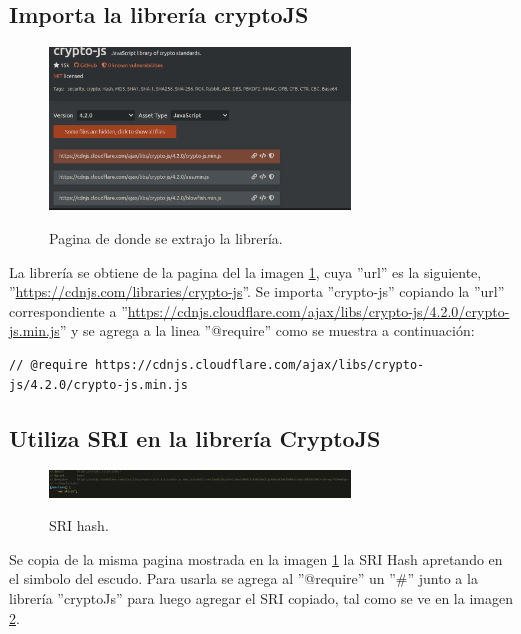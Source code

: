 \documentclass[letter,12pt]{article}
\begin{document}
\subsection{Importa la librería cryptoJS}
    \begin{figure}[H]
        \centering
        \includegraphics[width=8cm]{img/parte 2/pagina.png}
        \label{fig: pagina}
        \caption{Pagina de donde se extrajo la librería.}
    \end{figure}
    
La librería se obtiene de la pagina del la imagen \ref{fig: pagina}, cuya ''url'' es la siguiente, ''\url{https://cdnjs.com/libraries/crypto-js}''. Se importa ''crypto-js'' copiando la ''url'' correspondiente a ''\url{https://cdnjs.cloudflare.com/ajax/libs/crypto-js/4.2.0/crypto-js.min.js}'' y se agrega a la linea ''@require'' como se muestra a continuación: 
\begin{lstlisting}
// @require https://cdnjs.cloudflare.com/ajax/libs/crypto-js/4.2.0/crypto-js.min.js
\end{lstlisting}



\subsection{Utiliza SRI en la librería CryptoJS}

    \begin{figure}[H]
        \centering
        \includegraphics[width=8cm]{img/parte 3/4.2.png}
        \label{fig: 4.2}
        \caption{SRI hash.}
    \end{figure}
    
Se copia de la misma pagina mostrada en la imagen \ref{fig: pagina} la SRI Hash apretando en el simbolo del escudo. Para usarla se agrega al ''@require'' un ''\#'' junto a la librería ''cryptoJs'' para luego agregar el SRI copiado, tal como se ve en la imagen \ref{fig: 4.2}.
\end{document}
